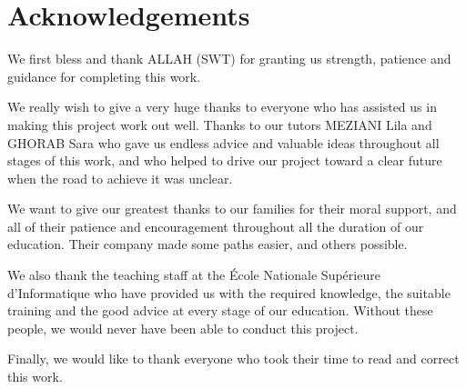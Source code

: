 \chapter*{Acknowledgements}

We first bless and thank ALLAH (SWT) for granting us strength, patience and guidance for completing this work.


We really wish to give a very huge thanks to everyone who has assisted us in making this project work out well. Thanks to our tutors MEZIANI Lila and GHORAB Sara who gave us endless advice and valuable ideas throughout all stages of this work, and who helped to drive our project toward a clear future when the road to achieve it was unclear.

We want to give our greatest thanks to our families for their moral support, and all of their patience and encouragement throughout all the duration of our education. Their company made some paths easier, and others possible.

We also thank the teaching staff at the École Nationale Supérieure d'Informatique who have provided us with the required knowledge, the suitable training and the good advice at every stage of our education. Without these people, we would never have been able to conduct this project.

Finally, we would like to thank everyone who took their time to read and correct this work.
\clearpage
